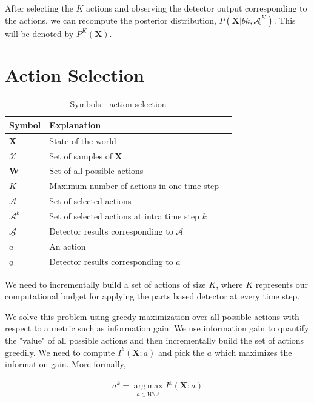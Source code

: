 \documentclass[10pt,twocolumn,letterpaper]{article}
\begin{document}
After selecting the $K $ actions and observing the detector output corresponding to the actions, we can recompute the posterior distribution, $P(\textbf{X}|bk, \underline{\mathcal{A}^{K}})$. This will be denoted by $P^{K}(\textbf{X})$.

\section{ Action Selection}

\begin{table}[ht]
  \begin{tabular}{lll}
   \hline
   Symbol & Explanation \\
   \hline
$\textbf{X} $ & State of the world\\
 $\mathcal{X} $ & Set of samples of $\textbf{X}$ \\
 $\textbf{W} $ & Set of all possible actions\\
 $K$ & Maximum number of actions in one time step\\
 $\mathcal{A} $ & Set of selected actions\\
 $\mathcal{A}^{k} $ & Set of selected actions at intra time step $k$\\
 $\underline{\mathcal{A}} $ & Detector results corresponding to $\mathcal{A}$\\
 $a $ & An action\\
 $ \underline{a} $ & Detector results corresponding to $ a$\\
   \hline
  \end{tabular}
  \caption{
    Symbols - action selection
  }
  \label{tab:Symbols in action selection}
\end{table}



We need to incrementally build a set of actions of size $ K $, where $ K $ represents our computational budget for applying the parts based detector at every time step. 

We solve this problem using greedy maximization over all possible actions with respect to a metric such as information gain. We use information gain to quantify the "value" of all possible actions and then incrementally build the set of actions greedily.
We need to compute $I^{k}(\textbf{X};a)$ and pick the $a$ which maximizes the information gain. More formally,

\begin{align}
a^{k} = \operatorname*{arg\,max}_{a\in W \setminus A} I^{k}(\textbf{X};a)
\end{align}
\end{document}
